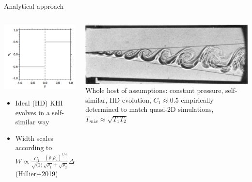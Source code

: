 \documentclass[10pt,aspectratio=169,usenames,dvipsnames]{beamer}
\begin{document}

\begin{frame}{Analytical approach}
\begin{columns}
\begin{column}{0.4\textwidth}
\includegraphics[width=0.95\linewidth]{2023Dundee/Figures/khiinterface.png}
\begin{itemize}
    \item Ideal (HD) KHI evolves in a self-similar way
    \item Width scales according to $W\propto \frac{C_1}{\sqrt(2)} \frac{\left( \rho_1 \rho_2 \right)^{1/4}}{\sqrt{\rho_1}+\sqrt{\rho_2}} \Delta v_t$ (Hillier+2019)
\end{itemize}
\end{column}
\begin{column}{0.6\textwidth}
\includegraphics[width=0.95\linewidth]{2023Dundee/Figures/selfsimilar.png} \\
Whole host of assumptions: constant pressure, self-similar, HD evolution, $C_1 \approx 0.5$ empirically determined to match quasi-2D simulations, $T_{mix} \approx \sqrt{T_1 T_2}$
\end{column}
\end{columns}
\end{frame}
\end{document}
